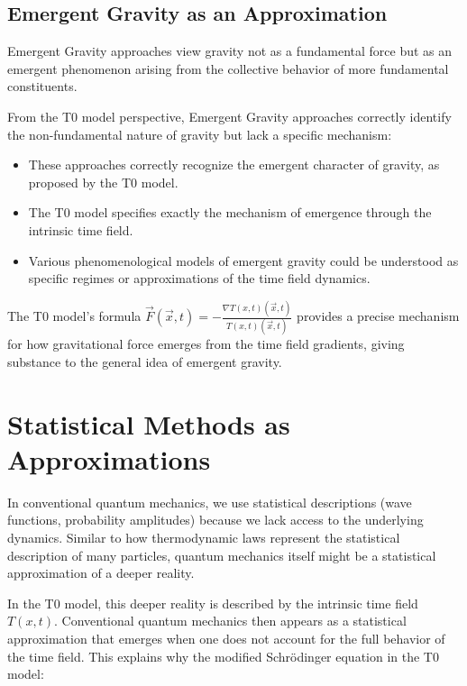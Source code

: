 \documentclass[12pt,a4paper]{article}
\newcommand{\Tfieldt}{T(x,t)}
\newcommand{\vecx}{\vec{x}}
\begin{document}
	\subsection{Emergent Gravity as an Approximation}
	\label{subsec:emergent}
	
	Emergent Gravity approaches view gravity not as a fundamental force but as an emergent phenomenon arising from the collective behavior of more fundamental constituents.
	
	From the T0 model perspective, Emergent Gravity approaches correctly identify the non-fundamental nature of gravity but lack a specific mechanism:
	
	\begin{itemize}
		\item These approaches correctly recognize the emergent character of gravity, as proposed by the T0 model.
		
		\item The T0 model specifies exactly the mechanism of emergence through the intrinsic time field.
		
		\item Various phenomenological models of emergent gravity could be understood as specific regimes or approximations of the time field dynamics.
	\end{itemize}
	
	The T0 model's formula $\vec{F}(\vecx,t) = -\frac{\nabla\Tfieldt(\vecx,t)}{\Tfieldt(\vecx,t)}$ provides a precise mechanism for how gravitational force emerges from the time field gradients, giving substance to the general idea of emergent gravity.
	
	\section{Statistical Methods as Approximations}
	\label{sec:statistical}
	
	In conventional quantum mechanics, we use statistical descriptions (wave functions, probability amplitudes) because we lack access to the underlying dynamics. Similar to how thermodynamic laws represent the statistical description of many particles, quantum mechanics itself might be a statistical approximation of a deeper reality.
	
	In the T0 model, this deeper reality is described by the intrinsic time field $\Tfieldt$. Conventional quantum mechanics then appears as a statistical approximation that emerges when one does not account for the full behavior of the time field. This explains why the modified Schrödinger equation in the T0 model:
	
\end{document}
